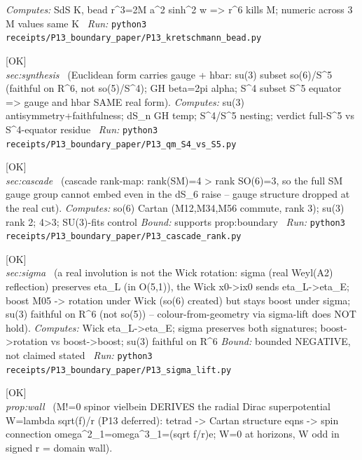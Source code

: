 \begin{description}
\emph{Computes:} SdS K, bead r\textasciicircum{}3=2M a\textasciicircum{}2 sinh\textasciicircum{}2 w => r\textasciicircum{}6 kills M; numeric across 3 M values same K
\ \emph{Run:} \texttt{python3 receipts/P13\_boundary\_paper/P13\_kretschmann\_bead.py}
\item[\label{rcpt:P13_qm_S4_vs_S5}\texttt{P13\_qm\_S4\_vs\_S5}]\hfill\textsf{[OK]}\\
\textit{sec:synthesis} \ (Euclidean form carries gauge + hbar: su(3) subset so(6)/S\textasciicircum{}5 (faithful on R\textasciicircum{}6, not so(5)/S\textasciicircum{}4); GH beta=2pi alpha; S\textasciicircum{}4 subset S\textasciicircum{}5 equator => gauge and hbar SAME real form). 
\emph{Computes:} su(3) antisymmetry+faithfulness; dS\_n GH temp; S\textasciicircum{}4/S\textasciicircum{}5 nesting; verdict full-S\textasciicircum{}5 vs S\textasciicircum{}4-equator residue
\ \emph{Run:} \texttt{python3 receipts/P13\_boundary\_paper/P13\_qm\_S4\_vs\_S5.py}
\item[\label{rcpt:P13_cascade_rank}\texttt{P13\_cascade\_rank}]\hfill\textsf{[OK]}\\
\textit{sec:cascade} \ (cascade rank-map: rank(SM)=4 > rank SO(6)=3, so the full SM gauge group cannot embed even in the dS\_6 raise -- gauge structure dropped at the real cut). 
\emph{Computes:} so(6) Cartan (M12,M34,M56 commute, rank 3); su(3) rank 2; 4>3; SU(3)-fits control
 \emph{Bound:} supports prop:boundary
\ \emph{Run:} \texttt{python3 receipts/P13\_boundary\_paper/P13\_cascade\_rank.py}
\item[\label{rcpt:P13_sigma_lift}\texttt{P13\_sigma\_lift}]\hfill\textsf{[OK]}\\
\textit{sec:sigma} \ (a real involution is not the Wick rotation: sigma (real Weyl(A2) reflection) preserves eta\_L (in O(5,1)), the Wick x0->ix0 sends eta\_L->eta\_E; boost M05 -> rotation under Wick (so(6) created) but stays boost under sigma; su(3) faithful on R\textasciicircum{}6 (not so(5)) -- colour-from-geometry via sigma-lift does NOT hold). 
\emph{Computes:} Wick eta\_L->eta\_E; sigma preserves both signatures; boost->rotation vs boost->boost; su(3) faithful on R\textasciicircum{}6
 \emph{Bound:} bounded NEGATIVE, not claimed stated
\ \emph{Run:} \texttt{python3 receipts/P13\_boundary\_paper/P13\_sigma\_lift.py}
\item[\label{rcpt:P14_B3_spinor_vielbein}\texttt{P14\_B3\_spinor\_vielbein}]\hfill\textsf{[OK]}\\
\textit{prop:wall} \ (M!=0 spinor vielbein DERIVES the radial Dirac superpotential W=lambda sqrt(f)/r (P13 deferred): tetrad -> Cartan structure eqns -> spin connection omega\textasciicircum{}2\_1=omega\textasciicircum{}3\_1=(sqrt f/r)e; W=0 at horizons, W odd in signed r = domain wall). 

\end{description}
